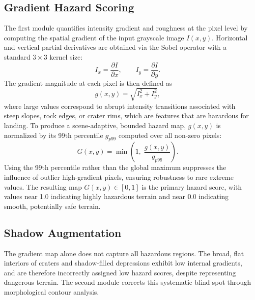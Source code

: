 \documentclass{article}
\begin{document}
\subsection{Gradient Hazard Scoring}
The first module quantifies intensity gradient and roughness at the pixel level by computing the spatial gradient of the input grayscale image $I(x,y)$. Horizontal and vertical partial derivatives are obtained via the Sobel operator\cite{sobel1968} with a standard $3 \times 3$ kernel size:
\begin{equation}
    I_x = \frac{\partial I}{\partial x}, \qquad I_y = \frac{\partial I}{\partial y}.
\end{equation}
The gradient magnitude at each pixel is then defined as
\begin{equation}
    g(x,y) = \sqrt{I_x^2 + I_y^2},
\end{equation}
where large values correspond to abrupt intensity transitions associated with steep slopes, rock edges, or crater rims, which are features that are hazardous for landing. To produce a scene-adaptive, bounded hazard map, $g(x,y)$ is normalized by its 99th percentile $g_{p99}$ computed over all non-zero pixels:
\begin{equation}
    G(x,y) = \min\!\left(1,\; \frac{g(x,y)}{g_{p99}}\right).
\end{equation}
Using the 99th percentile rather than the global maximum suppresses the influence of outlier high-gradient pixels, ensuring robustness to rare extreme values. The resulting map $G(x,y) \in [0,1]$ is the primary hazard score, with values near 1.0 indicating highly hazardous terrain and near 0.0 indicating smooth, potentially safe terrain.

\subsection{Shadow Augmentation}
The gradient map alone does not capture all hazardous regions. The broad, flat interiors of craters and shadow-filled depressions exhibit low internal gradients, and are therefore incorrectly assigned low hazard scores, despite representing dangerous terrain. The second module corrects this systematic blind spot through morphological contour analysis.
 
\end{document}
